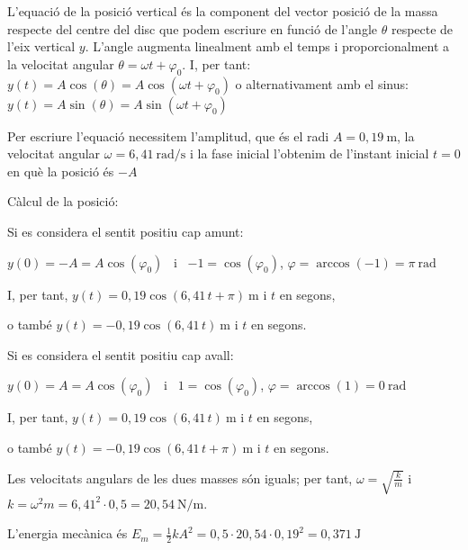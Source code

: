 \begin{solapartat}
 L'equació de la posició vertical és la component del vector posició de la massa respecte del centre del disc que podem escriure en funció de l'angle $\theta$ respecte de l'eix vertical $y$. L'angle augmenta linealment amb el temps i proporcionalment a la velocitat angular $\theta = \omega t + \varphi_0$. I, per tant: $y(t) = A\cos(\theta) = A\cos(\omega t + \varphi_0)$ o alternativament amb el sinus: $y(t) = A\sin(\theta) = A\sin(\omega t + \varphi_0)$

 Per escriure l'equació necessitem l'amplitud, que és el radi $A = 0,19\ \mathrm{m}$, la velocitat angular $\omega = 6,41\ \mathrm{rad/s}$ i la fase inicial l'obtenim de l'instant inicial $t = 0$ en què la posició és $-A$

 Càlcul de la posició:

Si es considera el sentit positiu cap amunt:

$y(0) = -A = A\cos(\varphi_0)$ \ i \ $-1 = \cos(\varphi_0)$, $\varphi = \arccos(-1) = \pi\ \mathrm{rad}$

I, per tant, $y(t) = 0,19\cos(6,41\,t + \pi)\ \mathrm{m}$ i $t$ en segons,

o també $y(t) = -0,19\cos(6,41\,t)\ \mathrm{m}$ i $t$ en segons.

Si es considera el sentit positiu cap avall:

$y(0) = A = A\cos(\varphi_0)$ \ i \ $1 = \cos(\varphi_0)$, $\varphi = \arccos(1) = 0\ \mathrm{rad}$

I, per tant, $y(t) = 0,19\cos(6,41\,t)\ \mathrm{m}$ i $t$ en segons,

o també $y(t) = -0,19\cos(6,41\,t + \pi)\ \mathrm{m}$ i $t$ en segons.

 Les velocitats angulars de les dues masses són iguals; per tant, $\omega = \sqrt{\frac{k}{m}}$ i $k = \omega^2 m = 6,41^2\cdot 0,5 = 20,54\ \mathrm{N/m}$.

 L'energia mecànica és $E_m = \frac{1}{2}kA^2 = 0,5\cdot 20,54\cdot 0,19^2 = 0,371\ \mathrm{J}$
\end{solapartat}

